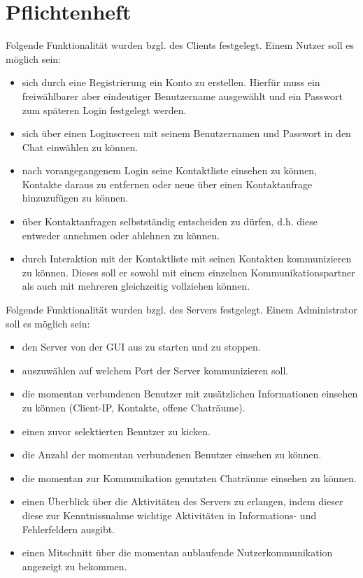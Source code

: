 \documentclass[12pt,a4paper,bibliography=totocnumbered,listof=totocnumbered]{scrartcl}
\begin{document}
\section{Pflichtenheft}
Folgende Funktionalität wurden bzgl. des Clients festgelegt.
Einem Nutzer soll es möglich sein:
\begin{itemize}
	\item sich durch eine Registrierung ein Konto zu erstellen. Hierfür muss ein freiwählbarer aber eindeutiger Benutzername ausgewählt und ein Passwort zum späteren Login festgelegt werden.
	\item sich über einen Loginscreen mit seinem Benutzernamen und Passwort in den Chat einwählen zu können.
	\item nach vorangegangenem Login seine Kontaktliste einsehen zu können, Kontakte daraus zu entfernen oder neue über einen Kontaktanfrage hinzuzufügen zu können.
	\item über Kontaktanfragen selbstständig entscheiden zu dürfen, d.h. diese entweder annehmen oder ablehnen zu können. 
	\item durch Interaktion mit der Kontaktliste mit seinen Kontakten kommunizieren zu können. Dieses soll er sowohl mit einem einzelnen Kommunikationspartner als auch mit mehreren gleichzeitig vollziehen können.
\end{itemize}


Folgende Funktionalität wurden bzgl. des Servers festgelegt.
Einem Administrator soll es möglich sein:
\begin{itemize}
	\item den Server von der GUI aus zu starten und zu stoppen.
	\item auszuwählen auf welchem Port der Server kommunizieren soll.
	\item die momentan verbundenen Benutzer mit zusätzlichen Informationen einsehen zu können (Client-IP, Kontakte, offene Chaträume).
	\item einen zuvor selektierten Benutzer zu kicken.
	\item die Anzahl der momentan verbundenen Benutzer einsehen zu können.
	\item die momentan zur Kommunikation genutzten Chaträume einsehen zu können.
	\item einen Überblick über die Aktivitäten des Servers zu erlangen, indem 
	dieser diese zur Kenntnissnahme wichtige Aktivitäten in Informations- und Fehlerfeldern ausgibt.
	\item einen Mitschnitt über die momentan aublaufende Nutzerkommunikation angezeigt zu bekommen.
\end{itemize} 
\end{document}

